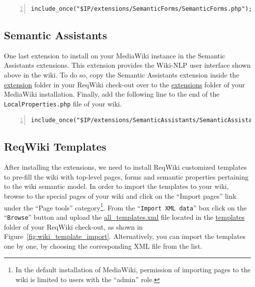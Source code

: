 \documentclass[10pt,twoside,openany,bibtotoc,liststotoc]{scrbook}
\newcommand{\sa}{Semantic Assistants\xspace}
\begin{document}
\begin{center}
\begin{lstlisting}[language=xml,numbers=left,xleftmargin=4mm,columns=flexible]
include_once("$IP/extensions/SemanticForms/SemanticForms.php");
\end{lstlisting}
\end{center}

\subsection{Semantic Assistants}
One last extension to install on your MediaWiki instance in the \sa extensions. This extension provides the Wiki-NLP user interface shown above in the wiki. To do so, copy the \sa extension inside the \url{extension} folder in your ReqWiki check-out over to the \url{extensions} folder of your MediaWiki installation. Finally, add the following line to the end of the \texttt{LocalProperties.php} file of your wiki.

\begin{center}
\begin{lstlisting}[language=xml,numbers=left,xleftmargin=4mm,columns=flexible]
include_once("$IP/extensions/SemanticAssistants/SemanticAssistants.php");
\end{lstlisting}
\end{center}

\subsection{ReqWiki Templates}
After installing the extensions, we need to install ReqWiki customized templates to pre-fill the wiki with top-level pages, forms and semantic properties pertaining to the wiki semantic model. In order to import the templates to your wiki, browse to the special pages of your wiki and click on the ``Import pages'' link under the ``Page tools'' category\footnote{In the default installation of MediaWiki, permission of importing pages to the wiki is limited to users with the ``admin'' role.}. From the ``\texttt{Import XML data}'' box click on the ``\texttt{Browse}'' button and upload the \url{all_templates.xml} file located in the \url{templates} folder of your ReqWiki check-out, as shown in Figure~\ref{fig:wiki_template_import}. Alternatively, you can import the templates one by one, by choosing the corresponding XML file from the list.
\end{document}
